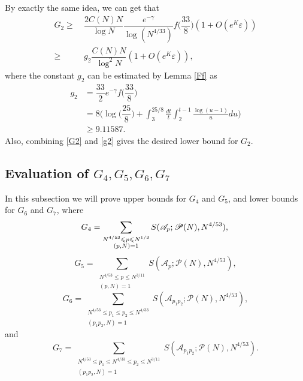 \documentclass[12pt, a4paper]{amsart}
\def\leq{\leqslant}
\def\le{\leqslant}
\def\ge{\geqslant}
\theoremstyle{plain}
\theoremstyle{remark}
\numberwithin{equation}{section}
\begin{document}
\medskip 

By exactly the same idea, we can get that 
\begin{equation}\label{G2}
\begin{aligned}
G_2\ge\ & \dfrac{2C(N)N}{\log N}\dfrac{e^{-\gamma}}{\log (N^{4/33})}f\bigg(\dfrac{33}{8}\bigg)(1+O(e^K\varepsilon))\\
\ge\ & g_2\dfrac{C(N)N}{\log^2 N}(1+O(e^K\varepsilon)),
\end{aligned}
\end{equation}
where the constant $g_2$ can be estimated by Lemma \ref{Ff} as 
\begin{equation}\label{g2}
\begin{aligned}
g_2&=\dfrac{33}{2}e^{-\gamma}f\bigg(\dfrac{33}{8}\bigg)\\
&=8\bigg(\log \bigg(\dfrac{25}{8}\bigg)+\int_3^{25/8} \frac{d t}{t} \int_2^{t-1} \frac{\log (u-1)}{u} d u\bigg)\\
&\ge 9.11587.
\end{aligned}
\end{equation}
Also, combining \eqref{G2} and \eqref{g2} gives the desired lower bound for $G_2$. 

\subsection{Evaluation of $G_4,G_5,G_6,G_7$}
In this subsection we will prove upper bounds for $G_4$ and $G_5$, and lower bounds for $G_6$ and $G_7$, where
\[	
G_4 = \sum_{\substack{N^{4/53} \leq p \le N^{1/3} \\ (p, N) = 1}} S(\mathscr{A}_p; \mathscr{P}(N), N^{4/53}),\\
\]
\[
G_5 = \sum_{\substack{N^{4/53} \leq p \le N^{3/11} \\ (p, N) = 1}} S(\mathscr{A}_p; \mathscr{P}(N), N^{4/53}),
\]
\[
G_6 = \sum_{\substack{N^{4/53} \leq p_1 \le p_2 \le N^{4/33} \\ (p_1 p_2, N) = 1}} S(\mathscr{A}_{p_1 p_2}; \mathscr{P}(N),N^{4/53}),
\]
and 
\[ 
G_7 = \sum_{\substack{N^{4/53} \leq p_1 \le N^{4/33} \le p_2 \le N^{3/11} \\ (p_1 p_2, N) = 1}} S(\mathscr{A}_{p_1 p_2}; \mathscr{P}(N), N^{4/53}).
\]
\end{document}
